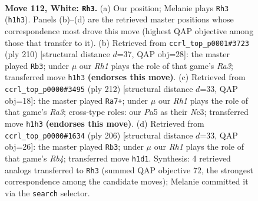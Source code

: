 \documentclass[11pt]{article}
\begin{document}
\clearpage

\begin{figure}[p]\centering
\begin{subfigure}{0.46\textwidth}\centering
\resizebox{\linewidth}{!}{%
\newchessgame
\chessboard[
  setfen={8/k7/p5r1/P1p2p1p/1p3P1P/1P2PKP1/8/7R w - - 11 112},
  showmover=false,
  pgfstyle=straightmove, color=movearrow, markmove={h1-h3}
]}
\caption{}
\end{subfigure}\hfill
\begin{subfigure}{0.46\textwidth}\centering
\resizebox{\linewidth}{!}{%
\newchessgame
\chessboard[
  setfen={8/5pk1/4p3/4Pp1p/5P1P/R5PK/4r3/8 w - - 95 106},
  showmover=false,
  pgfstyle=straightmove, color=movearrow, markmove={a3-b3}
]}
\caption{}
\end{subfigure}
\\[4pt]
\begin{subfigure}{0.46\textwidth}\centering
\resizebox{\linewidth}{!}{%
\newchessgame
\chessboard[
  setfen={8/4k3/3pp3/2p1p1bp/2P1P3/R1NP1KP1/1r3P2/8 w - - 8 107},
  showmover=false,
  pgfstyle=straightmove, color=movearrow, markmove={a3-a7}
]}
\caption{}
\end{subfigure}\hfill
\begin{subfigure}{0.46\textwidth}\centering
\resizebox{\linewidth}{!}{%
\newchessgame
\chessboard[
  setfen={8/2p5/3p2pk/r2Pp1p1/1RP1P3/5P1P/5K2/8 w - - 25 104},
  showmover=false,
  pgfstyle=straightmove, color=movearrow, markmove={b4-b3}
]}
\caption{}
\end{subfigure}
\caption{\textbf{Move 112, White: \texttt{Rh3}.} (a) Our position; Melanie plays \texttt{Rh3} (\texttt{h1h3}). Panels (b)--(d) are the retrieved master positions whose correspondence most drove this move (highest QAP objective among those that transfer to it). (b) Retrieved from \texttt{ccrl\_top\_p0001\#3723} (ply 210) [structural distance $d$=37, QAP obj=28]: the master played \texttt{Rb3}; under $\mu$ our \emph{Rh1} plays the role of that game's \emph{Ra3}; transferred move \texttt{h1h3} \textbf{(endorses this move)}. (c) Retrieved from \texttt{ccrl\_top\_p0000\#3495} (ply 212) [structural distance $d$=33, QAP obj=18]: the master played \texttt{Ra7+}; under $\mu$ our \emph{Rh1} plays the role of that game's \emph{Ra3}; cross-type roles: our \emph{P}a5 as their \emph{N}c3; transferred move \texttt{h1h3} \textbf{(endorses this move)}. (d) Retrieved from \texttt{ccrl\_top\_p0000\#1634} (ply 206) [structural distance $d$=33, QAP obj=26]: the master played \texttt{Rb3}; under $\mu$ our \emph{Rh1} plays the role of that game's \emph{Rb4}; transferred move \texttt{h1d1}. Synthesis: 4 retrieved analogs transferred to \texttt{Rh3} (summed QAP objective 72, the strongest correspondence among the candidate moves); Melanie committed it via the \texttt{search} selector.}
\label{fig:thought-m222}
\end{figure}
\end{document}
